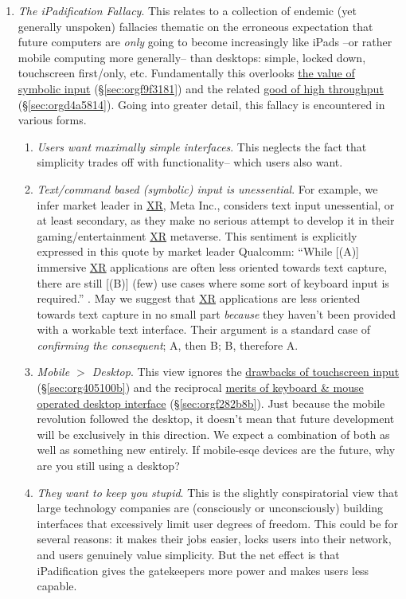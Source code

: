 \documentclass[logo,bsc,singlespacing,parskip]{infthesis}
\begin{document}
\begin{enumerate}
\item \emph{The iPadification Fallacy}.\label{ipadification fallacy}
This relates to a collection of endemic (yet generally unspoken) fallacies thematic on the erroneous expectation that future computers are \emph{only} going to become increasingly like iPads --or rather mobile computing more generally-- than desktops: simple, locked down, touchscreen first/only, etc.
Fundamentally this overlooks \hyperref[sec:orgf9f3181]{the value of symbolic input} (\S \ref{sec:orgf9f3181}) and the related \hyperref[sec:orgd4a5814]{good of high throughput} (\S \ref{sec:orgd4a5814}).
Going into greater detail, this fallacy is encountered in various forms.
\begin{enumerate}
\item \emph{Users want maximally simple interfaces}.
This neglects the fact that simplicity trades off with functionality-- which users also want.
\item \emph{Text/command based (symbolic) input is unessential}.
For example, we infer market leader in \hyperref[org1d567af]{XR},  Meta Inc., considers text input unessential, or at least secondary, as they make no serious attempt to develop it in their gaming/entertainment \hyperref[org1d567af]{XR} metaverse.
This sentiment is explicitly expressed in this quote by market leader Qualcomm: ``While [(A)] immersive \hyperref[org1d567af]{XR} applications are often less oriented towards text capture, there are still [(B)] (few) use cases where some sort of keyboard input is required.'' \autocite{qualcommXRUserInterfaces}.
May we suggest that \hyperref[org1d567af]{XR} applications are less oriented towards text capture in no small part \emph{because} they haven't been provided with a workable text interface.
Their argument is a standard case of \emph{confirming the consequent}; A, then B; B, therefore A.
\item \emph{Mobile \(>\) Desktop}.
This view ignores the \hyperref[sec:org405100b]{drawbacks of touchscreen input} (\S \ref{sec:org405100b}) and the reciprocal \hyperref[sec:orgf282b8b]{merits of keyboard \& mouse operated desktop interface} (\S \ref{sec:orgf282b8b}).
Just because the mobile revolution followed the desktop, it doesn't mean that future development will be exclusively in this direction.
We expect a combination of both as well as something new entirely.
If mobile-esqe devices are the future, why are you still using a desktop?
\item \emph{They want to keep you stupid}.
This is the slightly conspiratorial view that large technology companies are (consciously or unconsciously) building interfaces that excessively limit user degrees of freedom.
This could be for several reasons: it makes their jobs easier, locks users into their network, and users genuinely value simplicity.
But the net effect is that iPadification gives the gatekeepers more power and makes users less capable.
\end{enumerate}


\end{enumerate}
\end{document}
